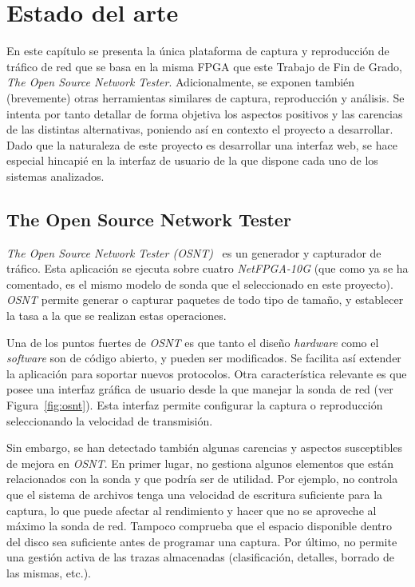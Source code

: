 \chapter{Estado del arte\label{cap:estadoDelArte}}

En este capítulo se presenta la única plataforma de captura y reproducción de tráfico de red que se basa en la misma \gls{FPGA} que este Trabajo de Fin de Grado, \textit{The Open Source Network Tester}.
Adicionalmente, se exponen también (brevemente) otras herramientas similares de captura, reproducción y análisis.
Se intenta por tanto detallar de forma objetiva los aspectos positivos y las carencias de las distintas alternativas, poniendo así en contexto el proyecto a desarrollar.
Dado que la naturaleza de este proyecto es desarrollar una interfaz web, se hace especial hincapié en la interfaz de usuario de la que dispone cada uno de los sistemas analizados.

\section{The Open Source Network Tester\label{sec:eda:osnt}}

\textit{The Open Source Network Tester (OSNT)}~\cite{osnt} es un generador y capturador de tráfico.
Esta aplicación se ejecuta sobre cuatro \textit{NetFPGA-10G} (que como ya se ha comentado, es el mismo modelo de sonda que el seleccionado en este proyecto).
\textit{OSNT} permite generar o capturar paquetes de todo tipo de tamaño, y establecer la tasa a la que se realizan estas operaciones.

Una de los puntos fuertes de \textit{OSNT} es que tanto el diseño \textit{hardware} como el \textit{software} son de código abierto, y pueden ser modificados.
Se facilita así extender la aplicación para soportar nuevos protocolos.
Otra característica relevante es que posee una interfaz gráfica de usuario desde la que manejar la sonda de red (ver Figura~\ref{fig:osnt}).
Esta interfaz permite configurar la captura o reproducción seleccionando la velocidad de transmisión.

Sin embargo, se han detectado también algunas carencias y aspectos susceptibles de mejora en \textit{OSNT}.
En primer lugar, no gestiona algunos elementos que están relacionados con la sonda y que podría ser de utilidad.
Por ejemplo, no controla que el sistema de archivos tenga una velocidad de escritura suficiente para la captura, lo que puede afectar al rendimiento y hacer que no se aproveche al máximo la sonda de red.
Tampoco comprueba que el espacio disponible dentro del disco sea suficiente antes de programar una captura.
Por último, no permite una gestión activa de las \glspl{traza} almacenadas (clasificación, detalles, borrado de las mismas, etc.).

